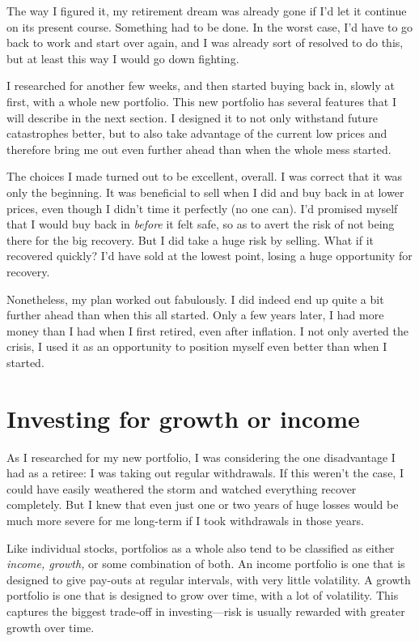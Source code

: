 The way I figured it, my retirement dream was already gone if I'd let it continue on its present course. Something had to be done. In the worst case, I'd have to go back to work and start over again, and I was already sort of resolved to do this, but at least this way I would go down fighting.

I researched for another few weeks, and then started buying back in, slowly at first, with a whole new portfolio. This new portfolio has several features that I will describe in the next section. I designed it to not only withstand future catastrophes better, but to also take advantage of the current low prices and therefore bring me out even further ahead than when the whole mess started.

The choices I made turned out to be excellent, overall. I was correct that it was only the beginning. It was beneficial to sell when I did and buy back in at lower prices, even though I didn't time it perfectly (no one can). I'd promised myself that I would buy back in \emph{before} it felt safe, so as to avert the risk of not being there for the big recovery. But I did take a huge risk by selling. What if it recovered quickly? I'd have sold at the lowest point, losing a huge opportunity for recovery.

Nonetheless, my plan worked out fabulously. I did indeed end up quite a bit further ahead than when this all started. Only a few years later, I had more money than I had when I first retired, even after inflation. I not only averted the crisis, I used it as an opportunity to position myself even better than when I started.

\section{Investing for growth or income}
As I researched for my new portfolio, I was considering the one disadvantage I had as a retiree: I was taking out regular withdrawals. If this weren't the case, I could have easily weathered the storm and watched everything recover completely. But I knew that even just one or two years of huge losses would be much more severe for me long-term if I took withdrawals in those years.

Like individual stocks, portfolios as a whole also tend to be classified as either \emph{income, growth,} or some combination of both. An income portfolio is one that is designed to give pay-outs at regular intervals, with very little volatility. A growth portfolio is one that is designed to grow over time, with a lot of volatility. This captures the biggest trade-off in investing---risk is usually rewarded with greater growth over time.

